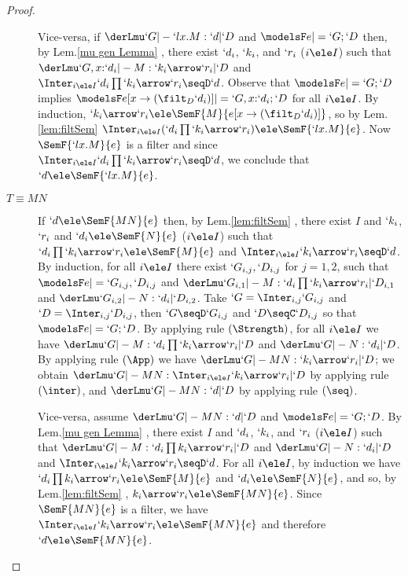 \documentclass{lmcs}
\begin{document}
\begin{proof}
\begin{description}
Vice-versa, if $ \derLmu `G |- `lx.M : `d | `D $ and $ \modelsF e |= `G;`D $ then, by Lem.\skp\ref{mu gen Lemma}%
, there exist %
$`d_i$, $`k_i$, and $`r_i$ ($i \ele I$) such that $ \derLmu `G,x{:}`d_i |- M : `k_i\arrow `r_i | `D $ and $\Inter_{i \ele I} `d_i\prod `k_i\arrow `r_i \seqD `d$.
Observe that $\modelsF e |= `G;`D $ implies $\modelsF e[x\to (\filt_D `d_i)] |= `G, x{:}`d_i;`D $ for all $i \ele I$.
By induction, $`k_i\arrow `r_i \ele \SemF { M }{ e[x\to (\filt_D `d_i)] }$, so by Lem.\skp\ref{lem:filtSem} %
 $\Inter_{i \ele I}(`d_i\prod `k_i\arrow `r_i) \ele \SemF { `l x.M}{ e } $. 
Now $\SemF { `l x.M}{ e }$ is a filter and since $\Inter_{i \ele I} `d_i\prod `k_i\arrow `r_i \seqD `d$, we conclude that $`d \ele \SemF { `l x.M}{ e }$. 

 \item [$ T\equiv MN $] 
If $`d \ele \SemF { MN}{ e }$ then, by Lem.\skp\ref{lem:filtSem}%
, there exist $I$ and $`k_i$, $`r_i$ and $`d_i \ele \SemF { N }{ e }$ ($i \ele I$) such that $`d_i\prod `k_i\arrow `r_i \ele \SemF { M }{ e }$ and $\Inter_{i \ele I}`k_i\arrow `r_i\seqD `d$. 
By induction, for all $i \ele I$ there exist $`G_{i,j},`D _{i,j}$ for $j=1,2$, such that $\modelsF e |= `G_{i,j},`D _{i,j} $ and $ \derLmu `G_{i,1} |- M : `d_i\prod `k_i\arrow `r_i | `D_{i,1} $ and $ \derLmu `G_{i,2} |- N : `d_i | `D_{i,2} $. 
Take $`G = \Inter_{i,j}`G_{i,j}$ and $`D = \Inter_{i,j}`D_{i,j}$, then $`G\seqD `G_{i,j}$ and $`D\seqC `D_{i,j}$ so that $\modelsF e |= `G;`D $.
By applying rule $(\Strength)$, for all $i \ele I$ we have $ \derLmu `G |- M : `d_i\prod `k_i\arrow `r_i | `D $ and $ \derLmu `G |- N : `d_i | `D $.
By applying rule $(\App)$ we have $ \derLmu `G |- MN : `k_i\arrow `r_i | `D $; we obtain $ \derLmu `G |- MN : \Inter_{i \ele I}`k_i\arrow `r_i | `D $ by applying rule $(\inter)$, and $ \derLmu `G |- MN : `d | `D $ by applying rule $(\seq)$.
	
Vice-versa, assume $ \derLmu `G |- MN : `d | `D $ and $\modelsF e |= `G;`D $. 
By Lem.\skp\ref{mu gen Lemma}%
, there exist $I$ and $`d_i$, $`k_i$, and $`r_i$ ($i \ele I$) such that $ \derLmu `G |- M : `d_i\prod k_i\arrow `r_i | `D $ and $ \derLmu `G |- N : `d_i | `D $ and $\Inter_{i \ele I}`k_i\arrow `r_i \seqD `d$.
For all $i \ele I$, by induction we have $`d_i\prod k_i\arrow `r_i \ele \SemF { M }{ e }$ and $`d_i \ele \SemF { N }{ e }$, and so, by Lem.\skp\ref{lem:filtSem}%
, $k_i\arrow `r_i \ele \SemF { MN }{ e }$. 
Since $\SemF { MN }{ e }$ is a filter, we have $\Inter_{i \ele I}`k_i\arrow `r_i \ele \SemF { MN }{ e }$ and therefore $`d \ele \SemF { MN }{ e }$.



\end{description}
\end{proof}
\end{document}
